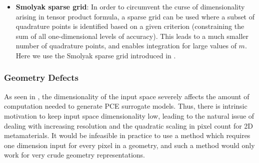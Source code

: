 \documentclass[preprint,review,12pt]{elsarticle}
\begin{document}
\begin{itemize}
    \item \textbf{Smolyak sparse grid}:
    In order to circumvent the curse of dimensionality arising in tensor product formula, a sparse grid can be used where a subset of quadrature points is identified based on a given criterion (constraining the sum of all one-dimensional levels of accuracy). This leads to a much smaller number of quadrature points, and enables integration for large values of $m$. Here we use the Smolyak sparse grid introduced in \citep{Smolyak}.
\end{itemize}

\subsubsection{Geometry Defects}
\label{subsubsec:m_geo}

As seen in , the dimensionality of the input space severely affects the amount of computation needed to generate PCE surrogate models. Thus, there is intrinsic motivation to keep input space dimensionality low, leading to the natural issue of dealing with increasing resolution and the quadratic scaling in pixel count for 2D metamaterials. It would be infeasible in practice to use a method which requires one dimension input for every pixel in a geometry, and such a method would only work for very crude geometry representations. 
\end{document}

